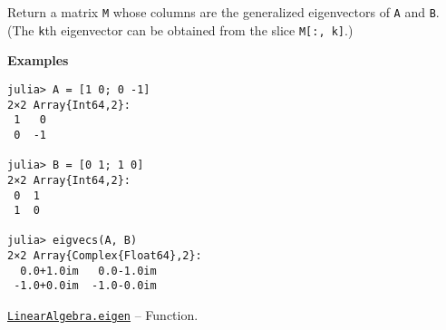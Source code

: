\begin{adjustwidth}{2em}{0pt}
Return a matrix \texttt{M} whose columns are the generalized eigenvectors of \texttt{A} and \texttt{B}. (The \texttt{k}th eigenvector can be obtained from the slice \texttt{M[:, k]}.)

\textbf{Examples}


\begin{verbatim}
julia> A = [1 0; 0 -1]
2×2 Array{Int64,2}:
 1   0
 0  -1

julia> B = [0 1; 1 0]
2×2 Array{Int64,2}:
 0  1
 1  0

julia> eigvecs(A, B)
2×2 Array{Complex{Float64},2}:
  0.0+1.0im   0.0-1.0im
 -1.0+0.0im  -1.0-0.0im
\end{verbatim}



\end{adjustwidth}
\hypertarget{11056016707394839114}{} 
\hyperlink{11056016707394839114}{\texttt{LinearAlgebra.eigen}}  -- {Function.}


